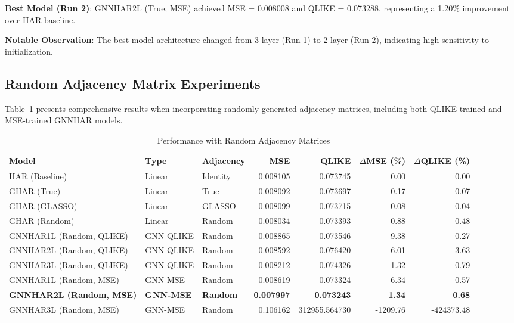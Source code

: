 \documentclass[10pt,a4paper]{article}
\begin{document}
\textbf{Best Model (Run 2)}: GNNHAR2L (True, MSE) achieved MSE = 0.008008 and QLIKE = 0.073288, representing a 1.20\% improvement over HAR baseline.

\textbf{Notable Observation}: The best model architecture changed from 3-layer (Run 1) to 2-layer (Run 2), indicating high sensitivity to initialization.

\subsection{Random Adjacency Matrix Experiments}

Table~\ref{tab:random} presents comprehensive results when incorporating randomly generated adjacency matrices, including both QLIKE-trained and MSE-trained GNNHAR models.

\begin{table}[H]
\centering
\caption{Performance with Random Adjacency Matrices}
\label{tab:random}
\small
\begin{tabular}{@{}lllrrrrr@{}}
\toprule
Model & Type & Adjacency & MSE & QLIKE & $\Delta$MSE (\%) & $\Delta$QLIKE (\%) \\
\midrule
HAR (Baseline) & Linear & Identity & 0.008105 & 0.073745 & 0.00 & 0.00 \\
GHAR (True) & Linear & True & 0.008092 & 0.073697 & 0.17 & 0.07 \\
GHAR (GLASSO) & Linear & GLASSO & 0.008099 & 0.073715 & 0.08 & 0.04 \\
GHAR (Random) & Linear & Random & 0.008034 & 0.073393 & 0.88 & 0.48 \\
\midrule
GNNHAR1L (Random, QLIKE) & GNN-QLIKE & Random & 0.008865 & 0.073546 & -9.38 & 0.27 \\
GNNHAR2L (Random, QLIKE) & GNN-QLIKE & Random & 0.008592 & 0.076420 & -6.01 & -3.63 \\
GNNHAR3L (Random, QLIKE) & GNN-QLIKE & Random & 0.008212 & 0.074326 & -1.32 & -0.79 \\
\midrule
GNNHAR1L (Random, MSE) & GNN-MSE & Random & 0.008619 & 0.073324 & -6.34 & 0.57 \\
\textbf{GNNHAR2L (Random, MSE)} & \textbf{GNN-MSE} & \textbf{Random} & \textbf{0.007997} & \textbf{0.073243} & \textbf{1.34} & \textbf{0.68} \\
GNNHAR3L (Random, MSE) & GNN-MSE & Random & 0.106162 & 312955.564730 & -1209.76 & -424373.48 \\
\bottomrule
\end{tabular}
\end{table}
\end{document}

